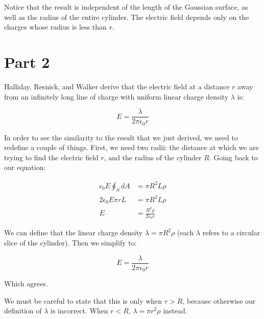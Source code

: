 \documentclass[12pt]{article}
\begin{document}
Notice that the result is independent of the length of the Gaussian
surface, as well as the radius of the entire cylinder.  The electric
field depends only on the charges whose radius is less than $r$. 

\section*{Part 2}

Halliday, Resnick, and Walker derive that the electric field at a
distance $r$ away from an infinitely long line of charge with uniform
linear charge density $\lambda$ is:

\[
    E = \frac{\lambda}{2\pi\epsilon_0 r}
\]

In order to see the similarity to the result that we just derived, we
need to redefine a couple of things.  First, we need two radii: the
distance at which we are trying to find the electric field $r$, and the
radius of the cylinder $R$.  Going back to our equation:

\begin{align*}
    \epsilon_0 E \oint_S dA &= \pi R^2 L\rho \\
    2 \epsilon_0 E \pi r L  &= \pi R^2 L\rho \\
                 E          &= \frac{R^2 \rho}{2 \epsilon_0 r}
\end{align*}

We can define that the linear charge density $\lambda = \pi R^2\rho$
(each $\lambda$ refers to a circular slice of the cylinder).  Then we
simplify to:

\[
    E = \frac{\lambda}{2 \pi \epsilon_0 r}
\]

Which agrees.

We must be careful to state that this is only when $r > R$, because
otherwise our definition of $\lambda$ is incorrect.  When $r < R$,
$\lambda = \pi r^2\rho$ instead.
\end{document}
